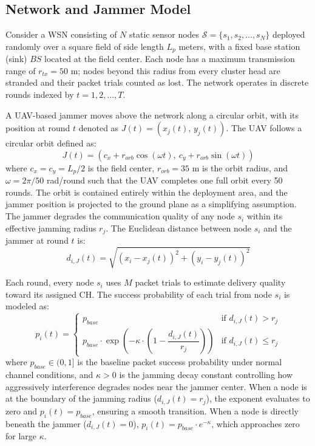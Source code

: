 \documentclass[conference]{IEEEtran}
\begin{document}
\subsection{Network and Jammer Model}

Consider a WSN consisting of $N$ static sensor nodes
$\mathcal{S} = \{s_1, s_2, \ldots, s_N\}$ deployed randomly over a
square field of side length $L_p$ meters, with a fixed base station
(sink) $BS$ located at the field center. Each node has a maximum
transmission range of $r_{tx} = 50$ m; nodes beyond this radius from
every cluster head are stranded and their packet trials counted as lost. The
network operates in discrete rounds indexed by $t = 1, 2, \ldots, T$.

A UAV-based jammer moves above the network along a circular orbit,
with its position at round $t$ denoted as $J(t) = (x_j(t),\, y_j(t))$.
The UAV follows a circular orbit defined as:
\begin{equation}
    J(t) = \left(c_x + r_{orb}\cos(\omega t),\ c_y + r_{orb}\sin(\omega t)\right)
\end{equation}
where $c_x = c_y = L_p/2$ is the field center, $r_{orb} = 35$ m is the
orbit radius, and $\omega = 2\pi/50$ rad/round such that the UAV
completes one full orbit every 50 rounds. The orbit is contained entirely
within the deployment area, and the jammer position is projected to the
ground plane as a simplifying assumption. The jammer degrades the
communication quality of any node $s_i$ within its effective jamming
radius $r_j$. The Euclidean distance between node $s_i$ and the jammer
at round $t$ is:
\begin{equation}
    d_{i,J}(t) = \sqrt{(x_i - x_j(t))^2 + (y_i - y_j(t))^2}
\end{equation}

Each round, every node $s_i$ uses $M$ packet trials to estimate delivery
quality toward its assigned CH. The success probability of each trial
from node $s_i$ is modeled as:
\begin{equation}
    p_i(t) =
    \begin{cases}
        p_{base} & \text{if } d_{i,J}(t) > r_j \\[6pt]
        p_{base} \cdot \exp\!\left(-\kappa \cdot \left(1 - \dfrac{d_{i,J}(t)}{r_j}\right)\right) & \text{if } d_{i,J}(t) \leq r_j
    \end{cases}
\end{equation}
\noindent where $p_{base} \in (0,1]$ is the baseline packet success
probability under normal channel conditions, and $\kappa > 0$ is the
jamming decay constant controlling how aggressively interference degrades
nodes near the jammer center. When a node is at the boundary of the
jamming radius ($d_{i,J}(t) = r_j$), the exponent evaluates to zero and
$p_i(t) = p_{base}$, ensuring a smooth transition. When a node is
directly beneath the jammer ($d_{i,J}(t) = 0$), $p_i(t) = p_{base}
\cdot e^{-\kappa}$, which approaches zero for large $\kappa$.
\end{document}
